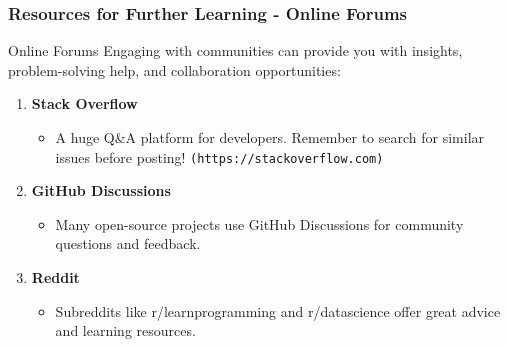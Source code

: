\documentclass[aspectratio=169]{beamer}
\begin{document}
\begin{frame}[fragile]
  \frametitle{Resources for Further Learning - Online Forums}
  \begin{block}{Online Forums}
    Engaging with communities can provide you with insights, problem-solving help, and collaboration opportunities:
  \end{block}
  
  \begin{enumerate}
    \item \textbf{Stack Overflow}
      \begin{itemize}
        \item A huge Q\&A platform for developers. Remember to search for similar issues before posting! \texttt{(https://stackoverflow.com)}
      \end{itemize}
  
    \item \textbf{GitHub Discussions}
      \begin{itemize}
        \item Many open-source projects use GitHub Discussions for community questions and feedback.
      \end{itemize}
  
    \item \textbf{Reddit}
      \begin{itemize}
        \item Subreddits like r/learnprogramming and r/datascience offer great advice and learning resources.
      \end{itemize}
  \end{enumerate}
\end{frame}
\end{document}
